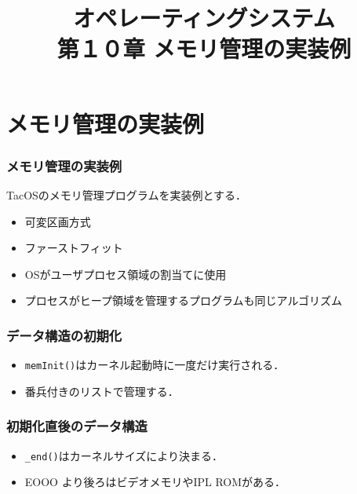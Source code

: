 \documentclass{beamer}                   %
\begin{document}
\title[主記憶]{オペレーティングシステム\\第１０章 メモリ管理の実装例}
\date{}

\begin{frame}
  \titlepage
\end{frame}


\section{メモリ管理の実装例}
\begin{frame}
  \frametitle{メモリ管理の実装例}
  TacOSのメモリ管理プログラムを実装例とする．
  \begin{itemize}
  \item 可変区画方式
  \item ファーストフィット
  \item OSがユーザプロセス領域の割当てに使用
  \item プロセスがヒープ領域を管理するプログラムも同じアルゴリズム
  \end{itemize}
\end{frame}

\begin{frame}
  \frametitle{データ構造の初期化}
  \begin{itemize}
  \item {\tt memInit()}はカーネル起動時に一度だけ実行される．
  \item 番兵付きのリストで管理する．
  \end{itemize}
\end{frame}

\begin{frame}
  \frametitle{初期化直後のデータ構造}
  \begin{itemize}
  \item {\tt \_end()}はカーネルサイズにより決まる．
  \item EOOO より後ろはビデオメモリやIPL ROMがある．
  \end{itemize}
\end{frame}
\end{document}
